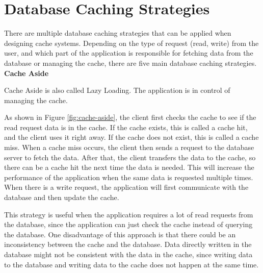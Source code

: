 \section[Database Caching Strategies]{Database Caching Strategies}

There are multiple database caching strategies that can be applied when designing cache systems.
Depending on the type of request (read, write) from the user, and which part of the application is responsible for fetching data from the database or managing the cache,
there are five main database caching strategies.\\


\noindent \textbf{Cache Aside}

Cache Aside is also called Lazy Loading. The application is in control of managing the cache.

% 



\cacheAsideFigure

\noindent As shown in Figure \ref{fig:cache-aside}, the client first checks the cache to see if the read request data is in the cache.
If the cache exists, this is called a cache hit, and the client uses it right away.
If the cache does not exist, this is called a cache miss. When a cache miss occurs, the client then sends a request to the database server to fetch the data.
After that, the client transfers the data to the cache, so there can be a cache hit the next time the data is needed.
This will increase the performance of the application when the same data is requested multiple times.
When there is a write request, the application will first communicate with the database and then update the cache.

This strategy is useful when the application requires a lot of read requests from the database,
since the application can just check the cache instead of querying the database.
One disadvantage of this approach is that there could be an inconsistency between the cache and the database.
Data directly written in the database might not be consistent with the data in the cache,
since writing data to the database and writing data to the cache does not happen at the same time.\\

